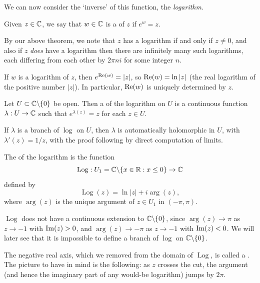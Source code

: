 \documentclass[a4paper]{scrartcl}
\begin{document}
We can now consider the `inverse' of this function, the \emph{logarithm}.

\begin{definition}[Logarithm]
    Given $z \in \mathbb{C}$, we say that $w \in \mathbb{C}$ is a  of $z$ if $e^w = z$.
\end{definition}

By our above theorem, we note that $z$ has a logarithm if and only if $z \neq 0$, and also if $z$ \emph{does} have a logarithm then there are infinitely many such logarithms, each differing from each other by $2 \pi n i$ for some integer $n$.

If $w$ is a logarithm of $z$, then $e^{\operatorname{Re}(w)} = |z|$, so $\operatorname{Re}(w) = \ln |z|$ (the real logarithm of the positive number $|z|$). In particular, $\operatorname{Re}(w)$ is uniquely determined by $z$.

\begin{definition}
    Let $U \subset \mathbb{C} \backslash \{0\}$ be open. Then a  of the logarithm on $U$ is a continuous function $\lambda : U \rightarrow \mathbb{C}$ such that $e^{\lambda(z)} = z$ for each $z \in U$.
\end{definition}

\begin{remark}
    If $\lambda$ is a branch of $\log$ on $U$, then $\lambda$ is automatically holomorphic in $U$, with $\lambda'(z) = 1/z$, with the proof following by direct computation of limits.
\end{remark}

\begin{definition}
The  of the logarithm is the function
$$
\operatorname{Log}: U_1 = \mathbb{C} \backslash \{x \in \mathbb{R} : x \leq 0\} \rightarrow \mathbb{C}
$$
defined by
$$
\operatorname{Log}(z) = \ln|z| + i \arg(z),
$$
where $\arg(z)$ is the unique argument of $z \in U_1$ in $(-\pi, \pi)$.
\end{definition}

\begin{remark}
    $\operatorname{Log}$ does not have a continuous extension to $\mathbb{C} \backslash \{0\}$, since $\arg(z) \rightarrow \pi$ as $z \rightarrow -1$ with $\operatorname{Im}(z) > 0$, and $\arg(z) \rightarrow -\pi$ as $z \rightarrow -1$ with $\operatorname{Im} (z) < 0$. We will later see that it is impossible to define a branch of $\log$ on $\mathbb{C} \backslash \{0\}$.
\end{remark}

The negative real axis, which we removed from the domain of $\operatorname{Log}$, is called a . The picture to have in mind is the following: as $z$ crosses the cut, the argument (and hence the imaginary part of any would-be logarithm) jumps by $2\pi$.
\end{document}

